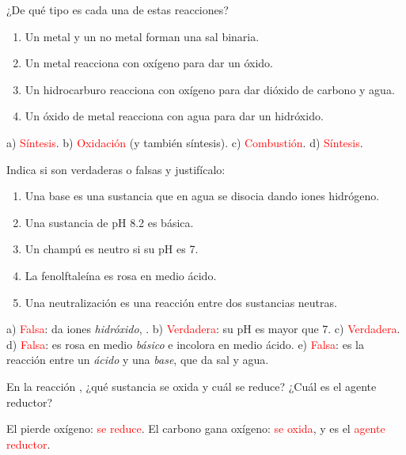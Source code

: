 \begin{exercise}
    ¿De qué tipo es cada una de estas reacciones?
    \begin{enumerate}[label=\alph*)]
        \item Un metal y un no metal forman una sal binaria.
        \item Un metal reacciona con oxígeno para dar un óxido.
        \item Un hidrocarburo reacciona con oxígeno para dar dióxido de carbono y agua.
        \item Un óxido de metal reacciona con agua para dar un hidróxido.
    \end{enumerate}
    \begin{solu}
        a) \textcolor{red}{Síntesis}. b) \textcolor{red}{Oxidación} (y también síntesis). c) \textcolor{red}{Combustión}. d) \textcolor{red}{Síntesis}.
    \end{solu}
\end{exercise}

\begin{exercise}
    Indica si son verdaderas o falsas y justifícalo:
    \begin{enumerate}[label=\alph*)]
        \item Una base es una sustancia que en agua se disocia dando iones hidrógeno.
        \item Una sustancia de pH \num{8.2} es básica.
        \item Un champú es neutro si su pH es 7.
        \item La fenolftaleína es rosa en medio ácido.
        \item Una neutralización es una reacción entre dos sustancias neutras.
    \end{enumerate}
    \begin{solu}
        a) \textcolor{red}{Falsa}: da iones \emph{hidróxido}, . b) \textcolor{red}{Verdadera}: su pH es mayor que 7. c) \textcolor{red}{Verdadera}. d) \textcolor{red}{Falsa}: es rosa en medio \emph{básico} e incolora en medio ácido. e) \textcolor{red}{Falsa}: es la reacción entre un \emph{ácido} y una \emph{base}, que da sal y agua.
    \end{solu}
\end{exercise}

\begin{exercise}
    En la reacción , ¿qué sustancia se oxida y cuál se reduce? ¿Cuál es el agente reductor?
    \begin{solu}
        El  pierde oxígeno: \textcolor{red}{se reduce}. El carbono gana oxígeno: \textcolor{red}{se oxida}, y es el \textcolor{red}{agente reductor}.
    \end{solu}
\end{exercise}

